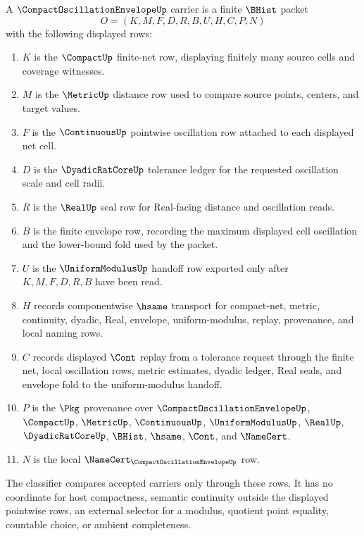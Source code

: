 \begin{definition}
\label{def:compact-oscillation-envelope-carrier}
A $\CompactOscillationEnvelopeUp$ carrier is a finite $\BHist$ packet
$$
O=(K,M,F,D,R,B,U,H,C,P,N)
$$
with the following displayed rows:
\begin{enumerate}
\item $K$ is the $\CompactUp$ finite-net row, displaying finitely many source cells and coverage witnesses.
\item $M$ is the $\MetricUp$ distance row used to compare source points, centers, and target values.
\item $F$ is the $\ContinuousUp$ pointwise oscillation row attached to each displayed net cell.
\item $D$ is the $\DyadicRatCoreUp$ tolerance ledger for the requested oscillation scale and cell radii.
\item $R$ is the $\RealUp$ seal row for Real-facing distance and oscillation reads.
\item $B$ is the finite envelope row, recording the maximum displayed cell oscillation and the lower-bound fold used by the packet.
\item $U$ is the $\UniformModulusUp$ handoff row exported only after $K,M,F,D,R,B$ have been read.
\item $H$ records componentwise $\hsame$ transport for compact-net, metric, continuity, dyadic, Real, envelope, uniform-modulus, replay, provenance, and local naming rows.
\item $C$ records displayed $\Cont$ replay from a tolerance request through the finite net, local oscillation rows, metric estimates, dyadic ledger, Real seals, and envelope fold to the uniform-modulus handoff.
\item $P$ is the $\Pkg$ provenance over $\CompactOscillationEnvelopeUp$, $\CompactUp$, $\MetricUp$, $\ContinuousUp$, $\UniformModulusUp$, $\RealUp$, $\DyadicRatCoreUp$, $\BHist$, $\hsame$, $\Cont$, and $\NameCert$.
\item $N$ is the local $\NameCert_{\CompactOscillationEnvelopeUp}$ row.
\end{enumerate}
The classifier compares accepted carriers only through these rows. It has no coordinate for host compactness, semantic continuity outside the displayed pointwise rows, an external selector for a modulus, quotient point equality, countable choice, or ambient completeness.
\end{definition}

